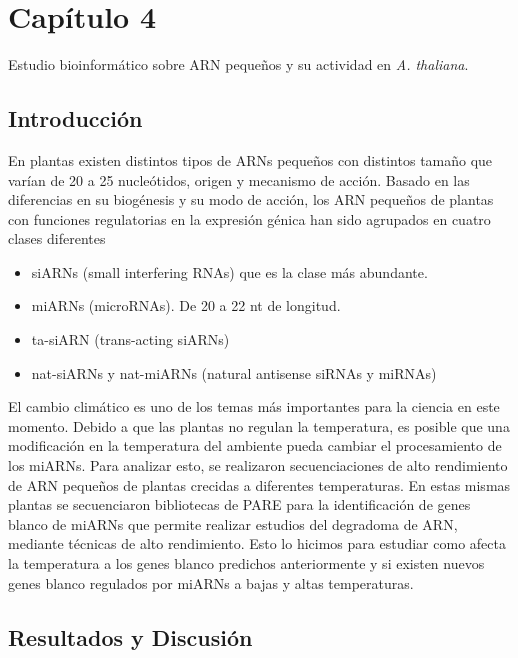 
\graphicspath{{Chapter4/Figs/}}

\setcounter{chapter}{7}
\chapter*{Capítulo 4} 
\setcounter{figure}{0}
\setcounter{section}{0}

{\LARGE Estudio bioinformático sobre ARN pequeños y su actividad en \textit{A. thaliana}.}

\section{Introducción}

En plantas existen distintos tipos de ARNs pequeños con distintos tamaño que varían de 20 a 25 nucleótidos, origen y mecanismo de acción.
Basado en las diferencias en su biogénesis y su modo de acción, los ARN pequeños de plantas con funciones regulatorias en la expresión génica han sido agrupados en cuatro clases diferentes
\begin{itemize}
	\item siARNs 	(small interfering RNAs) que es la clase más abundante. 
	\item miARNs (microRNAs). De 20 a 22 nt de longitud.
	\item ta-siARN (trans-acting siARNs)
	\item nat-siARNs y nat-miARNs (natural antisense siRNAs y miRNAs)
\end{itemize}

El cambio climático es uno de los temas más importantes para la ciencia en este momento. 
Debido a que las plantas no regulan la temperatura, es posible que una modificación en la temperatura del ambiente pueda cambiar el procesamiento de los miARNs.
Para analizar esto, se realizaron secuenciaciones de alto rendimiento de ARN pequeños de plantas crecidas a diferentes temperaturas.
En estas mismas plantas se secuenciaron bibliotecas de PARE \citep{pmid19247285} para la identificación de genes blanco de miARNs que permite realizar estudios del degradoma de ARN, mediante técnicas de alto rendimiento.
Esto lo hicimos para estudiar como afecta la temperatura a los genes blanco predichos anteriormente y si existen nuevos genes blanco regulados por miARNs a bajas y altas temperaturas.

\section{Resultados y Discusión}

